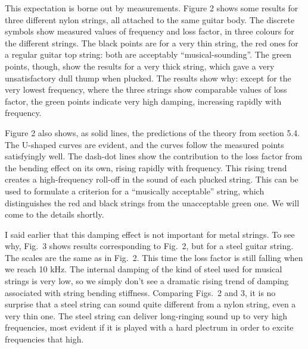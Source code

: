   This expectation is borne out by measurements. Figure 2 shows some results 
  for three different nylon strings, all attached to the same guitar body. The 
  discrete symbols show measured values of frequency and loss factor, in three 
  colours for the different strings. The black points are for a very thin 
  string, the red ones for a regular guitar top string: both are acceptably 
  ``musical-sounding''. The green points, though, show the results for a very 
  thick string, which gave a very unsatisfactory dull thump when plucked. The 
  results show why: except for the very lowest frequency, where the three 
  strings show comparable values of loss factor, the green points indicate very 
  high damping, increasing rapidly with frequency. 


  Figure 2 also shows, as solid lines, the predictions of the theory from 
  section 5.4. The U-shaped curves are evident, and the curves follow the 
  measured points satisfyingly well. The dash-dot lines show the contribution 
  to the loss factor from the bending effect on its own, rising rapidly with 
  frequency. This rising trend creates a high-frequency roll-off in the sound 
  of each plucked string. This can be used to formulate a criterion for a 
  ``musically acceptable'' string, which distinguishes the red and black 
  strings from the unacceptable green one. We will come to the details shortly. 

  I said earlier that this damping effect is not important for metal strings. 
  To see why, Fig.\ 3 shows results corresponding to Fig.\ 2, but for a steel 
  guitar string. The scales are the same as in Fig.\ 2. This time the loss 
  factor is still falling when we reach 10 kHz. The internal damping of the 
  kind of steel used for musical strings is very low, so we simply don't see a 
  dramatic rising trend of damping associated with string bending stiffness. 
  Comparing Figs.\ 2 and 3, it is no surprise that a steel string can sound 
  quite different from a nylon string, even a very thin one. The steel string 
  can deliver long-ringing sound up to very high frequencies, most evident if 
  it is played with a hard plectrum in order to excite frequencies that high. 


